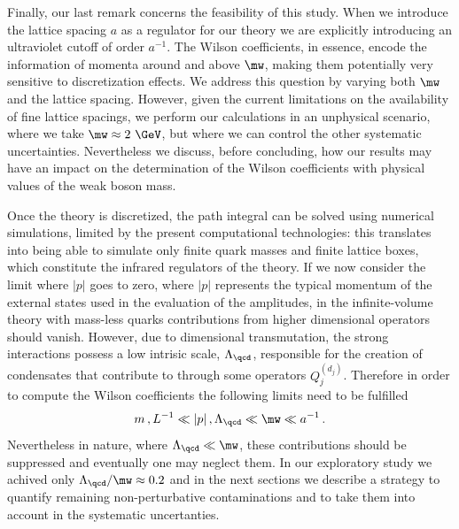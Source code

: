 \documentclass[aps,prd,twocolumn,nofootinbib,showpacs,superscriptaddress]{revtex4-1}
\begin{document}
Finally, our last remark concerns the feasibility of this 
study. When we introduce the lattice spacing $a$ as a regulator for our theory
we are explicitly introducing an ultraviolet cutoff of order $a^{-1}$.
The Wilson coefficients, in essence, encode the information of momenta
around and above $\mw$, making them potentially very sensitive to discretization
effects. We address this question
by varying both $\mw$ and the lattice spacing.
However, given the current limitations on the availability of fine lattice spacings, we 
perform our calculations in an unphysical scenario, where we take $\mw \approx 2~ \GeV$, 
but where we can control the other systematic uncertainties.
Nevertheless we discuss, before concluding, 
how our results may have an impact 
on the determination of the Wilson coefficients 
with physical values of the weak boson mass.

Once the theory is discretized, the path integral can be solved using numerical
simulations, limited by the present computational technologies:
this translates into being able to simulate only finite quark masses and
finite lattice boxes, which constitute the infrared regulators of the theory.
If we now consider the limit where $|p|$ goes to zero, 
where $|p|$ represents the typical momentum of the external states used in the
evaluation of the amplitudes,
in the infinite-volume 
theory with mass-less quarks contributions from higher dimensional operators 
should vanish. However, due to dimensional transmutation,
the strong interactions possess a low intrisic scale, $\Lambda_\qcd$,
responsible for the creation of condensates that 
contribute to  through some operators $Q_j^{(d_j)}$.
Therefore in order to compute the Wilson coefficients the following limits 
need to be fulfilled
\begin{equation}
m \,, L^{-1} \ll |p| \,, \Lambda_\qcd \ll \mw \ll a^{-1} \,.
\label{eq:window}
\end{equation}
Nevertheless in nature, where $\Lambda_\qcd \ll \mw$, 
these contributions should be suppressed and eventually one may neglect them.
In our exploratory study we achived only $\Lambda_\qcd/\mw \approx 0.2$ 
and in the next sections we describe a strategy to quantify
remaining non-perturbative contaminations and to take them into account in the
systematic uncertanties.\\
\end{document}
